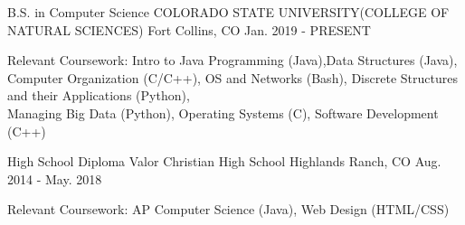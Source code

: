 

\begin{cventries}

  \cventry
    {B.S. in Computer Science} %
    {COLORADO STATE UNIVERSITY(COLLEGE OF NATURAL SCIENCES)} %
    {Fort Collins, CO} %
    {Jan. 2019 - PRESENT} %
    {
      \begin{cvitems} %
        \item {Relevant Coursework: Intro to Java Programming (Java),Data Structures (Java), \\
        Computer Organization (C/C++), OS and Networks (Bash), Discrete Structures and their Applications (Python), \\
         Managing Big Data (Python), Operating Systems (C), Software Development (C++)}
      \end{cvitems}
    }


    \cventry
    {High School Diploma} %
    {Valor Christian High School} %
    {Highlands Ranch, CO} %
    {Aug. 2014 - May. 2018} %
    {
      \begin{cvitems} %
        \item {Relevant Coursework: AP Computer Science (Java), Web Design (HTML/CSS)}
      \end{cvitems}
    }
\end{cventries}
